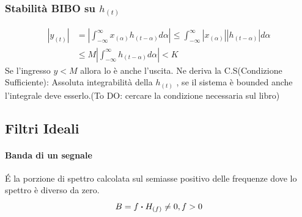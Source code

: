         \subsubsection{Stabilità BIBO su $h_{(t)}$}
            \begin{align}
                |y_{(t)}| &= \left|\int_{-\infty}^{\infty}x_{(\alpha)}h_{(t-\alpha)} d\alpha \right|\leq \int_{-\infty}^{\infty}|x_{(\alpha)}||h_{(t-\alpha)}| d\alpha \nonumber \\
                          &\leq M\left|\int_{-\infty}^{\infty}h_{(t-\alpha)} d\alpha \right| <K\nonumber
            \end{align}
            Se l'ingresso $y<M$ allora lo è anche l'uscita. Ne deriva la C.S(Condizione Sufficiente): Assoluta integrabilità della $h_{(t)}$ ,
            se il sistema è bounded anche l'integrale deve esserlo.(To DO: cercare la condizione necessaria sul libro)
    \subsection{Filtri Ideali}
        \paragraph{Banda di un segnale} É la porzione di spettro calcolata sul semiasse positivo delle
        frequenze dove lo spettro è diverso da zero.
        \[
            B = {f\dotproduct H_{(f)} \neq 0, f >0}  
        \]
